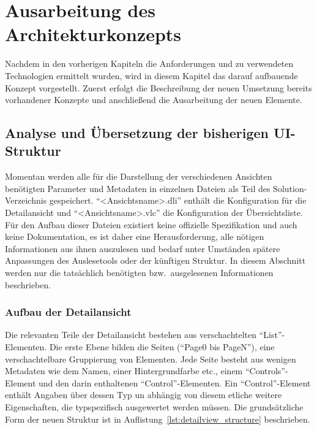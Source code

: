 \chapter{Ausarbeitung des Architekturkonzepts}\label{chap:concept}
Nachdem in den vorherigen Kapiteln die Anforderungen und zu verwendeten Technologien ermittelt wurden, wird in diesem Kapitel das darauf aufbauende Konzept vorgestellt. Zuerst erfolgt die Beschreibung der neuen Umsetzung bereits vorhandener Konzepte und anschließend die Ausarbeitung der neuen Elemente.

\section{Analyse und Übersetzung der bisherigen UI-Struktur}\label{sec:ui_structure_translation}
Momentan werden alle für die Darstellung der verschiedenen Ansichten benötigten Parameter und Metadaten in einzelnen Dateien als Teil des Solution-Verzeichnis gespeichert. \enquote{<Ansichtsname>.dli} enthält die Konfiguration für die Detailansicht und \enquote{<Ansichtsname>.vlc} die Konfiguration der Übersichtsliste. Für den Aufbau dieser Dateien existiert keine offizielle Spezifikation und auch keine Dokumentation, es ist daher eine Herausforderung, alle nötigen Informationen aus ihnen auszulesen und bedarf unter Umständen spätere Anpassungen des Auslesetools oder der künftigen Struktur. In diesem Abschnitt werden nur die tatsächlich benötigten bzw.\ ausgelesenen Informationen beschrieben.

\subsection{Aufbau der Detailansicht}
Die relevanten Teile der Detailansicht bestehen aus verschachtelten \enquote{List}-Elementen. Die erste Ebene bilden die Seiten (\enquote{Page0 bis PageN}), eine verschachtelbare Gruppierung von Elementen. Jede Seite besteht aus wenigen Metadaten wie dem Namen, einer Hintergrundfarbe etc., einem \enquote{Controls}-Element und den darin enthaltenen \enquote{Control}-Elementen. Ein \enquote{Control}-Element enthält Angaben über dessen Typ un abhängig von diesem etliche weitere Eigenschaften, die typspezifisch ausgewertet werden müssen. Die grundsätzliche Form der neuen Struktur ist in Auflistung~\ref{lst:detailview_structure} beschrieben.



